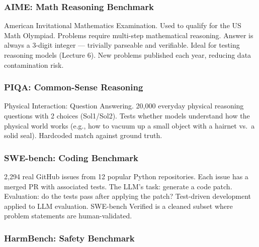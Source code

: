 \documentclass[11pt, a4paper]{article}
\begin{document}
\subsubsection{AIME: Math Reasoning Benchmark}

\begin{defbox}[AIME]
American Invitational Mathematics Examination. Used to qualify for the US Math Olympiad. Problems require multi-step mathematical reasoning. Answer is always a 3-digit integer --- trivially parseable and verifiable. Ideal for testing reasoning models (Lecture 6). New problems published each year, reducing data contamination risk.
\end{defbox}

\subsubsection{PIQA: Common-Sense Reasoning}

\begin{defbox}
Physical Interaction: Question Answering. 20,000 everyday physical reasoning questions with 2 choices (Sol1/Sol2). Tests whether models understand how the physical world works (e.g., how to vacuum up a small object with a hairnet vs.\ a solid seal). Hardcoded match against ground truth.
\end{defbox}

\subsubsection{SWE-bench: Coding Benchmark}

\begin{defbox}
2,294 real GitHub issues from 12 popular Python repositories. Each issue has a merged PR with associated tests. The LLM's task: generate a code patch. Evaluation: do the tests pass after applying the patch? Test-driven development applied to LLM evaluation. SWE-bench Verified is a cleaned subset where problem statements are human-validated.
\end{defbox}

\subsubsection{HarmBench: Safety Benchmark}
\end{document}
